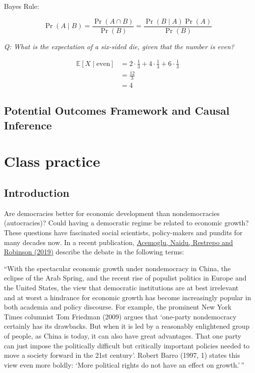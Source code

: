 \documentclass[
  11pt,
  letterpaper]{article}
\begin{document}
Bayes Rule:

\[
\Pr(A \mid B) = \frac{\Pr(A \cap B)}{\Pr(B)} = \frac{\Pr(B \mid A) \Pr(A)}{\Pr(B)}
\]

\emph{Q: What is the expectation of a six-sided die, given that the
number is even?}

\[
\begin{aligned}
\mathbb{E}[X \mid \mathrm{even}]  & = 2 \cdot \frac{1}{3 } + 4 \cdot \frac{1}{3} + 6 \cdot \frac{1}{3} \\
 & = \frac{12}{3} \\
 & = 4
\end{aligned}
\]

\subsection{Potential Outcomes Framework and Causal
Inference}\label{potential-outcomes-framework-and-causal-inference}

\newpage

\section{Class practice}\label{class-practice}

\subsection{Introduction}\label{introduction}

Are democracies better for economic development than nondemocracies
(autocracies)? Could having a democratic regime be related to economic
growth? These questions have fascinated social scientists, policy-makers
and pundits for many decades now. In a recent publication,
\href{https://economics.mit.edu/sites/default/files/publications/Democracy\%20Does\%20Cause\%20Growth.pdf}{Acemoglu,
Naidu, Restrepo and Robinson (2019)} describe the debate in the
following terms:

``With the spectacular economic growth under nondemocracy in China, the
eclipse of the Arab Spring, and the recent rise of populist politics in
Europe and the United States, the view that democratic institutions are
at best irrelevant and at worst a hindrance for economic growth has
become increasingly popular in both academia and policy discourse. For
example, the prominent New York Times columnist Tom Friedman (2009)
argues that `one-party nondemocracy certainly has its drawbacks. But
when it is led by a reasonably enlightened group of people, as China is
today, it can also have great advantages. That one party can just impose
the politically difficult but critically important policies needed to
move a society forward in the 21st century'. Robert Barro (1997, 1)
states this view even more boldly: `More political rights do not have an
effect on growth.'\,''
\end{document}
